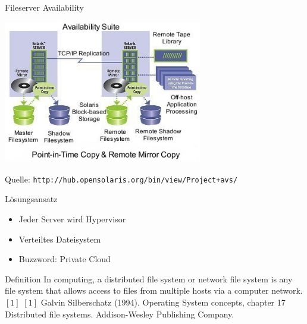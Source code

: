 \documentclass[notes=hide,yellow]{beamer}
\begin{document}
\begin{frame}{Fileserver Availability}
	\begin{center}
	\includegraphics[width=0.65\textwidth]{availabilitysuitenew.jpg}
	\end{center}
	\small
	Quelle: \texttt{http://hub.opensolaris.org/bin/view/Project+avs/}
\end{frame}


\begin{frame}{L\"osungsansatz}
	
	\begin{itemize}
		\item Jeder Server wird Hypervisor
		\item Verteiltes Dateisystem 
		\item <2> Buzzword: \glqq Private Cloud\grqq
	\end{itemize}

\end{frame}

\begin{frame}{Definition}
		In computing, a distributed file system or network file system is any file system that allows access to files from multiple hosts via a computer network.$[1]$
	\tiny{$[1]$ Galvin Silberschatz (1994). Operating System concepts, chapter 17 Distributed file systems. Addison-Wesley Publishing Company.} \\ 
\end{frame}
\end{document}
